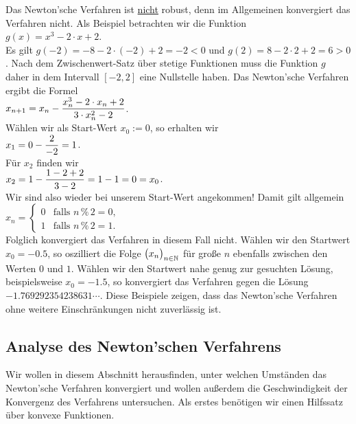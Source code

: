 Das Newton'sche Verfahren ist \underline{nicht} robust, denn im Allgemeinen  konvergiert das Verfahren
nicht.  Als Beispiel betrachten wir die 
Funktion 
\\[0.2cm]
\hspace*{1.3cm}
$g(x) = x^3 - 2 \cdot x + 2$.
\\[0.2cm]
Es gilt $g(-2) = -8 - 2 \cdot (-2) + 2 = -2 < 0$ und $g(2) = 8 - 2 \cdot 2 + 2 = 6 > 0$.  Nach dem 
Zwischenwert-Satz \"uber stetige Funktionen muss die Funktion $g$ daher in dem Intervall $[-2, 2]$ eine
Nullstelle haben.  Das Newton'sche Verfahren ergibt die Formel
\\[0.2cm]
\hspace*{1.3cm}
$\displaystyle x_{n+1} = x_n - \frac{x_n^3 - 2 \cdot x_n + 2}{3 \cdot x_n^2 - 2}$.
\\[0.2cm]
W\"ahlen wir als Start-Wert $x_0 := 0$, so erhalten wir 
\\[0.2cm]
\hspace*{1.3cm}
$\displaystyle x_1 = 0 - \frac{2}{-2} = 1$.
\\[0.2cm]
F\"ur $x_2$ finden wir
\\[0.2cm]
\hspace*{1.3cm}
$\displaystyle x_{2} = 1 - \frac{1 - 2 + 2}{3 - 2} = 1 - 1 = 0 = x_0$.
\\[0.2cm]
Wir sind also wieder bei unserem Start-Wert angekommen!  Damit gilt allgemein
\\[0.2cm]
\hspace*{1.3cm}
$x_n = \left\{
\begin{array}{ll}
  0 & \mbox{falls $n \,\texttt{\%}\, 2 = 0$,} \\[0.2cm]
  1 & \mbox{falls $n \,\texttt{\%}\, 2 = 1$.}
\end{array} 
\right.
$
\\[0.2cm] %
Folglich konvergiert das Verfahren in diesem Fall nicht.  W\"ahlen wir den Startwert $x_0 = -0.5$, so
oszilliert die Folge $\bigl(x_n\bigr)_{n\in\mathbb{N}}$ f\"ur gro{\ss}e $n$ ebenfalls zwischen den Werten $0$ und $1$.
W\"ahlen wir den Startwert nahe genug zur gesuchten L\"osung, beispielsweise $x_0 = -1.5$, so
konvergiert das Verfahren gegen die L\"osung 
$-1.769292354238631\cdots$.  Diese Beispiele zeigen, dass das Newton'sche Verfahren ohne weitere
Einschr\"ankungen nicht zuverl\"assig ist.

\subsection{Analyse des Newton'schen Verfahrens}
Wir wollen in diesem Abschnitt herausfinden, unter welchen Umst\"anden das Newton'sche Verfahren
konvergiert und wollen au{\ss}erdem die Geschwindigkeit der Konvergenz des Verfahrens untersuchen.
Als erstes ben\"otigen wir einen Hilfssatz \"uber konvexe Funktionen.

